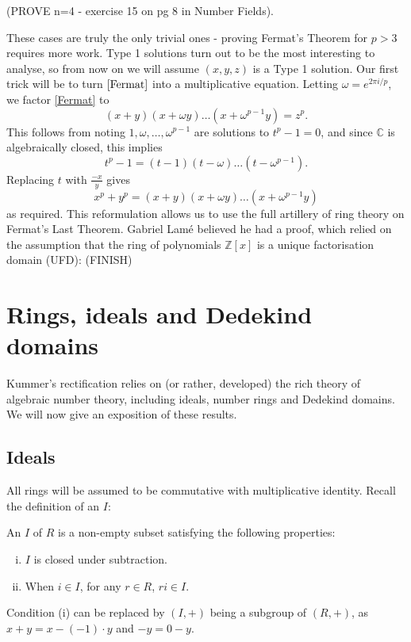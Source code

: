 (PROVE n=4 - exercise 15 on pg 8 in Number Fields).

These cases are truly the only trivial ones - proving Fermat's Theorem for $p>3$ requires more work. Type 1 solutions turn out to be the most interesting to analyse, so from now on we will assume $(x,y,z)$ is a Type 1 solution. Our first trick will be to turn $\cref{Fermat}$ into a multiplicative equation. Letting $\omega=e^{2\pi i/p}$, we factor \cref{Fermat} to
$$(x+y)(x+\omega y)\dots(x+\omega^{p-1} y)=z^p.$$
This follows from noting $1,\omega,\dots,\omega^{p-1}$ are solutions to $t^p-1=0$, and since $\mathbb{C}$ is algebraically closed, this implies
$$t^p-1=(t-1)(t-\omega)\dots (t-\omega^{p-1}).$$
Replacing $t$ with $\frac{-x}{y}$ gives
$$x^p+y^p=(x+y)(x+\omega y)\dots (x+\omega^{p-1}y)$$
as required. This reformulation allows us to use the full artillery of ring theory on Fermat's Last Theorem.
Gabriel Lamé believed he had a proof, which relied on the assumption that the ring of polynomials $\mathbb{Z}[x]$ is a unique factorisation domain (UFD): (FINISH)

\section{Rings, ideals and Dedekind domains}\label{sec-rings}
Kummer's rectification relies on (or rather, developed) the rich theory of algebraic number theory, including ideals, number rings and Dedekind domains. We will now give an exposition of these results.
\subsection{Ideals}
All rings will be assumed to be commutative with multiplicative identity. Recall the definition of an  $I$:
\begin{definition}
An  $I$ of $R$ is a non-empty subset satisfying the following properties:
\begin{enumerate}[(i)]
    \item $I$ is closed under subtraction.
    \item When $i\in I$, for any $r\in R$, $ri\in I$.
\end{enumerate}
\end{definition}

\begin{remark}
Condition (i) can be replaced by $(I,+)$ being a subgroup of $(R,+)$, as $x+y=x-(-1)\cdot y$ and $-y=0-y$.
\end{remark}

